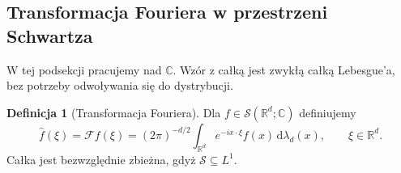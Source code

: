 \documentclass[11pt,a4paper]{article}
\numberwithin{equation}{section}
\theoremstyle{plain}
\theoremstyle{definition}
\newtheorem{definicja}[twierdzenie]{Definicja}
\theoremstyle{remark}
\newcommand{\R}{\mathbb R}
\newcommand{\C}{\mathbb C}
\begin{document}
\subsection{Transformacja Fouriera w przestrzeni Schwartza}

W tej podsekcji pracujemy nad $\C$. Wzór z całką jest zwykłą
całką Lebesgue'a, bez potrzeby odwoływania się do dystrybucji.

\begin{definicja}[Transformacja Fouriera]
\label{def:fourier-schwartz17}
Dla $f\in\mathcal S(\R^d;\C)$ definiujemy
\[
\widehat f(\xi)=\mathcal Ff(\xi)=
(2\pi)^{-d/2}\int_{\R^d}e^{-ix\cdot\xi}f(x)\,
\mathrm d\lambda_d(x),\qquad\xi\in\R^d.
\]
Całka jest bezwzględnie zbieżna, gdyż $\mathcal S\subseteq L^1$.
\end{definicja}
\end{document}
